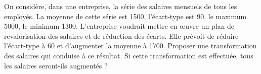 
\begin{exercice}\label{exosmath-0248}


On considère, dans une entreprise, la série des salaires mensuels de tous les employés.  La moyenne de cette série est 1500, l'écart-type est 90, le maximum 5000, le minimum 1300.  L'entreprise voudrait mettre en œuvre un plan de revalorisation des salaires et de réduction des écarts.  Elle prévoit de réduire l'écart-type à 60 et d'augmenter la moyenne à 1700.  Proposer une transformation des salaires qui conduise à ce résultat. Si cette transformation est effectuée, tous les salaires seront-ils augmentés ?


\end{exercice}
